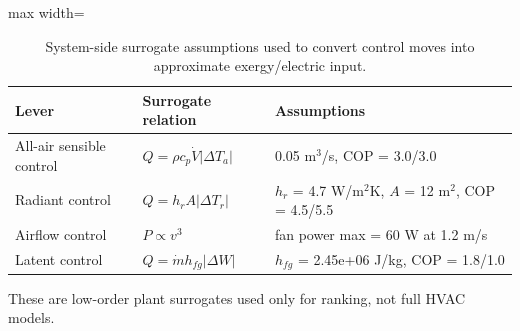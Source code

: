 \begin{table}[t]
\centering
\caption{System-side surrogate assumptions used to convert control moves into approximate exergy/electric input.}
\label{tab:system}
\begin{adjustbox}{max width=\textwidth}
\begin{tabular}{p{3.0cm}p{4.5cm}p{6.0cm}}
\toprule
Lever & Surrogate relation & Assumptions \\
\midrule
All-air sensible control & $Q = \rho c_p \dot V |\Delta T_a|$ & 0.05 m$^3$/s, COP = 3.0/3.0 \\
Radiant control & $Q = h_r A |\Delta T_r|$ & $h_r$ = 4.7 W/m$^2$K, $A$ = 12 m$^2$, COP = 4.5/5.5 \\
Airflow control & $P \propto v^3$ & fan power max = 60 W at 1.2 m/s \\
Latent control & $Q = \dot m h_{{fg}} |\Delta W|$ & $h_{fg}$ = 2.45e+06 J/kg, COP = 1.8/1.0 \\
\bottomrule
\end{tabular}
\end{adjustbox}
\begin{flushleft}\footnotesize These are low-order plant surrogates used only for ranking, not full HVAC models.\end{flushleft}
\end{table}
